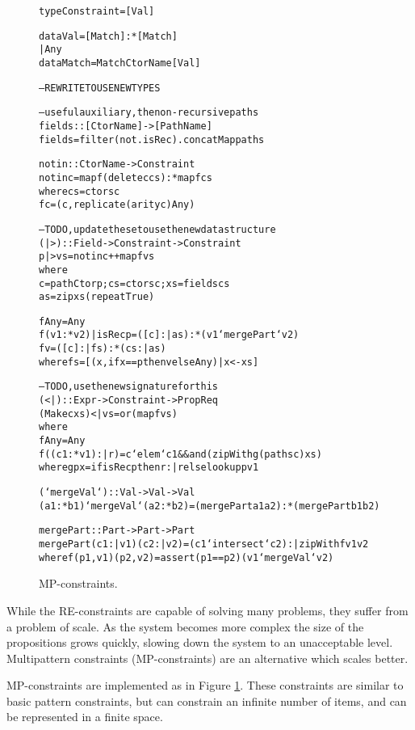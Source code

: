 \documentclass[preprint]{sigplanconf}
\newenvironment{code}{\begin{alltt}\small}{\end{alltt}}
\begin{document}
\begin{figure}
\begin{code}
type Constraint = [Val]

data Val    =  [Match] :* [Match]
            |  Any
data Match  =  Match CtorName [Val]

-- REWRITE TO USE NEW TYPES

-- useful auxiliary, the non-recursive paths
fields :: [CtorName] -> [PathName]
fields = filter (not . isRec) . concatMap paths

notin :: CtorName -> Constraint
notin c = map f (delete c cs) :* map f cs
    where  cs = ctors c
           f c = (c, replicate (arity c) Any)

-- TODO, update these to use the new data structure
(|>) :: Field -> Constraint -> Constraint
p |> vs = notin c ++ map f vs
    where
    c = pathCtor p; cs = ctors c; xs = fields cs
    as = zip xs (repeat True)

    f Any = Any
    f (v1 :* v2) | isRec p = ([c] :| as) :* (v1 `mergePart` v2)
    f v = ([c] :| fs) :* (cs :| as)
        where fs = [(x, if x == p then v else Any) |  x <- xs]

-- TODO, use the new signature for this
(<|) :: Expr -> Constraint -> Prop Req
(Make c xs) <| vs = or (map f vs)
    where
    f Any = Any
    f ((c1 :* v1) :| r) = c `elem` c1 && and (zipWith g (paths c) xs)
        where g p x = if isRec p then r :| r else lookup p v1

(`mergeVal`) :: Val -> Val -> Val
(a1 :* b1) `mergeVal` (a2 :* b2) = (mergePart a1 a2) :* (mergePart b1 b2)

mergePart :: Part -> Part -> Part
mergePart (c1 :| v1) (c2 :| v2) = (c1 `intersect` c2) :| zipWith f v1 v2
    where f (p1,v1) (p2,v2) = assert (p1 == p2) (v1 `mergeVal` v2)
\end{code}
\caption{MP-constraints.}
\label{fig:enumeration}
\end{figure}

While the RE-constraints are capable of solving many problems, they suffer from a problem of scale. As the system becomes more complex the size of the propositions grows quickly, slowing down the system to an unacceptable level. Multipattern constraints (MP-constraints) are an alternative which scales better.

MP-constraints are implemented as in Figure \ref{fig:enumeration}. These constraints are similar to basic pattern constraints, but can constrain an infinite number of items, and can be represented in a finite space.
\end{document}
